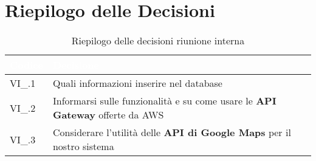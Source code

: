 \section{Riepilogo delle Decisioni}


\begin{table}[!htbp]
\renewcommand{\arraystretch}{1.5}
\begin{tabular}{m{}<{\centering}  m{}<{\centering}}
\rowcolor{darkblue} \textcolor{white}{\textbf{Codice}} & \textcolor{white}{\textbf{Decisione}} \\
\hline
VI\_{}\D{}.1 & Quali informazioni inserire nel database\\
VI\_{}\D{}.2 & Informarsi sulle funzionalità e su come usare le \textbf{API Gateway} offerte da AWS \\
VI\_{}\D{}.3 & Considerare l'utilità delle \textbf{API di Google Maps} per il nostro sistema\\
\end{tabular}
\caption{Riepilogo delle decisioni riunione interna \D}
\end{table}